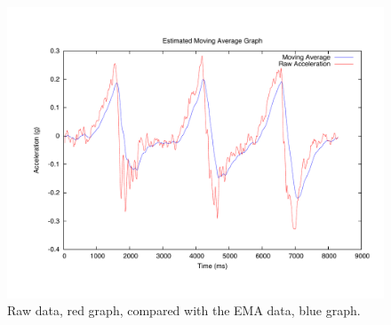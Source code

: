 \begin{figure}[H]
	\centering
	\includegraphics[scale=0.45, trim=0cm 2cm 0cm 2cm]{media/gnuplot/ema.pdf}
	\caption{Raw data, red graph, compared with the EMA data, blue graph.}
	\label{fig:EMA}
\end{figure}
